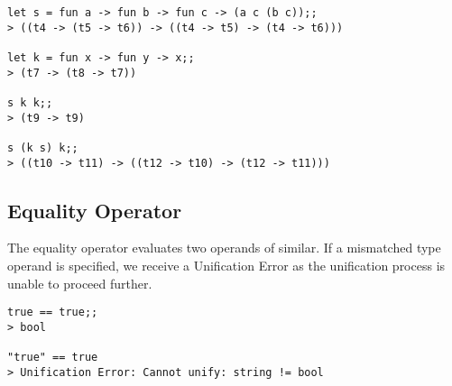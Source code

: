 \begin{verbatim}
let s = fun a -> fun b -> fun c -> (a c (b c));;
> ((t4 -> (t5 -> t6)) -> ((t4 -> t5) -> (t4 -> t6)))

let k = fun x -> fun y -> x;;
> (t7 -> (t8 -> t7))

s k k;;
> (t9 -> t9)

s (k s) k;;
> ((t10 -> t11) -> ((t12 -> t10) -> (t12 -> t11)))
\end{verbatim}

\subsection{Equality Operator}
The equality operator evaluates two operands of similar. If a mismatched type operand is specified, we receive a Unification Error as the unification process is unable to proceed further.

\begin{verbatim}
true == true;;
> bool

"true" == true
> Unification Error: Cannot unify: string != bool
\end{verbatim}
